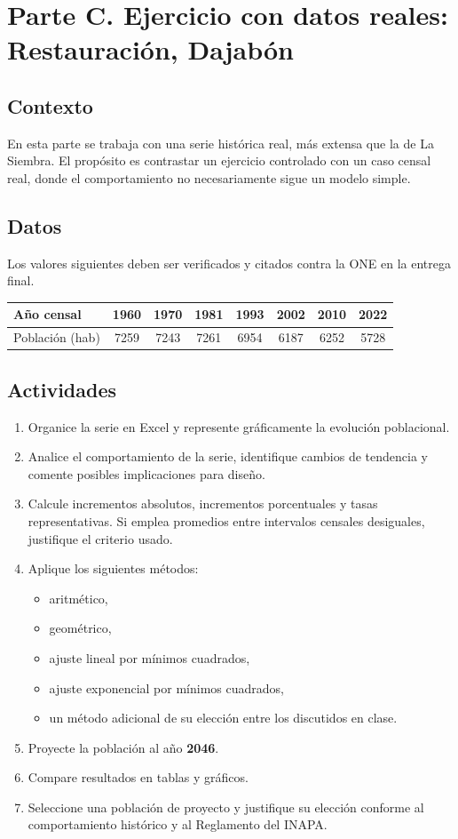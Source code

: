 \documentclass[12pt]{article}
\begin{document}
\section{Parte C. Ejercicio con datos reales: Restauración, Dajabón}
\subsection{Contexto}
En esta parte se trabaja con una serie histórica real, más extensa que la de La Siembra. El propósito es contrastar un ejercicio controlado con un caso censal real, donde el comportamiento no necesariamente sigue un modelo simple.

\subsection{Datos}
Los valores siguientes deben ser verificados y citados contra la ONE en la entrega final.

\begin{center}
\begin{tabular}{lccccccc}
\toprule
Año censal & 1960 & 1970 & 1981 & 1993 & 2002 & 2010 & 2022 \\
\midrule
Población (hab) & \num{7259} & \num{7243} & \num{7261} & \num{6954} & \num{6187} & \num{6252} & \num{5728} \\
\bottomrule
\end{tabular}
\end{center}

\subsection{Actividades}
\begin{enumerate}
\item Organice la serie en Excel y represente gráficamente la evolución poblacional.
\item Analice el comportamiento de la serie, identifique cambios de tendencia y comente posibles implicaciones para diseño.
\item Calcule incrementos absolutos, incrementos porcentuales y tasas representativas. Si emplea promedios entre intervalos censales desiguales, justifique el criterio usado.
\item Aplique los siguientes métodos:
\begin{itemize}
\item aritmético,
\item geométrico,
\item ajuste lineal por mínimos cuadrados,
\item ajuste exponencial por mínimos cuadrados,
\item un método adicional de su elección entre los discutidos en clase.
\end{itemize}
\item Proyecte la población al año \textbf{2046}.
\item Compare resultados en tablas y gráficos.
\item Seleccione una población de proyecto y justifique su elección conforme al comportamiento histórico y al Reglamento del INAPA.
\end{enumerate}
\end{document}
